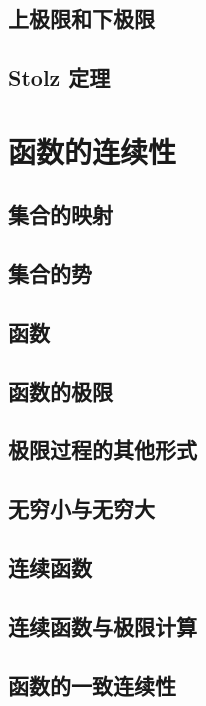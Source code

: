 \documentclass[a4paper, 11pt]{ctexbook}
\begin{document}
        \section{上极限和下极限}
        \section{Stolz 定理}
            
    \chapter{函数的连续性}
        \section{集合的映射}
        \section{集合的势}
        \section{函数}
            
        \section{函数的极限}
            
        \section{极限过程的其他形式}
            
        \section{无穷小与无穷大}
            
        \section{连续函数}
        \section{连续函数与极限计算}
            
        \section{函数的一致连续性}
\end{document}
